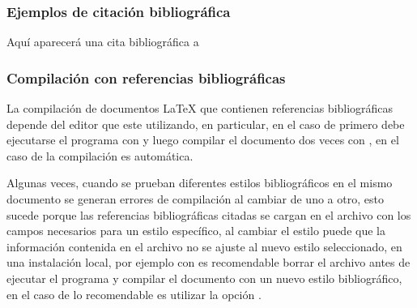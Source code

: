 \documentclass[10pt,a4paper]{article}
\begin{document}
\subsubsection{Ejemplos de citación bibliográfica}

\lipsum[2]

Aquí aparecerá una cita bibliográfica a \cite{Bellman2013} 

\subsubsection{Compilación con referencias bibliográficas}

La compilación de documentos \LaTeX{} que contienen referencias bibliográficas depende del editor que este utilizando, en particular, en el caso de  primero debe ejecutarse el programa  con  y luego compilar el documento dos veces con , en el caso de \wllogo{} la compilación es automática.

Algunas veces, cuando se prueban diferentes estilos bibliográficos en el mismo documento se generan errores de compilación al cambiar de uno a otro, esto sucede porque las referencias bibliográficas citadas se cargan en el archivo  con los campos necesarios para un estilo específico, al cambiar el estilo puede que la información contenida en el archivo  no se ajuste al nuevo estilo seleccionado, en una instalación local, por ejemplo con  es recomendable borrar el archivo  antes de ejecutar el programa  y compilar el documento con un nuevo estilo bibliográfico, en el caso de \wllogo{} lo recomendable es utilizar la opción .

\lipsum[1]

{} %


\nocite{Campbell2011}
\end{document}
